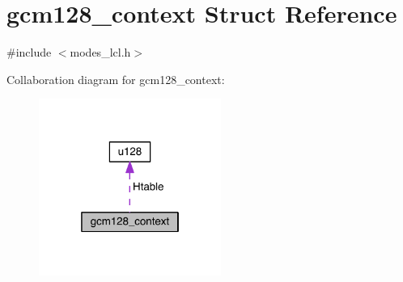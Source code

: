 \hypertarget{structgcm128__context}{}\section{gcm128\+\_\+context Struct Reference}
\label{structgcm128__context}


{\ttfamily \#include $<$modes\+\_\+lcl.\+h$>$}



Collaboration diagram for gcm128\+\_\+context\+:\nopagebreak
\begin{figure}[H]
\begin{center}
\leavevmode
\includegraphics[width=169pt]{structgcm128__context__coll__graph}
\end{center}
\end{figure}
